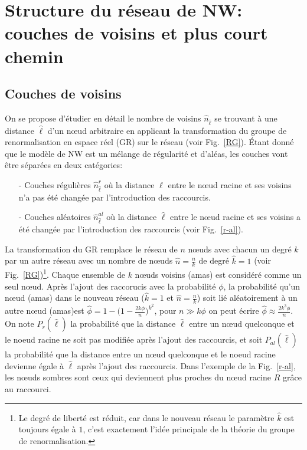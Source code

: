 \section{Structure du réseau de NW: couches de voisins et plus court chemin }

\subsection{Couches de voisins}
On se propose d'étudier en détail le nombre de voisins  $\hat{n}_{\hat{\ell}}$ se trouvant  à une distance $\hat{\ell}$ d'un nœud arbitraire en applicant la transformation du groupe de renormalisation en espace réel (GR) sur le réseau (voir Fig.~\ref{RG}). \'{E}tant donné que le modèle de NW est un mélange de régularité et d'aléas, les couches vont être séparées en deux catégories: 
\begin{itemize}
\item[-] Couches régulières $\hat{n}_{\hat{\ell}}^r$ où la distance $\hat{\ell}$ entre le nœud racine et ses voisins n'a pas été changée par l'introduction des raccourcis.
\item [-] Couches aléatoires $\hat{n}_{\hat{\ell}}^{al}$ où la distance $\hat{\ell}$ entre le nœud racine et ses voisins a été changée par l'introduction des raccourcis (voir Fig.~\ref{r-al}).
\end{itemize}
La transformation du GR remplace le réseau de $n$ nœuds avec chacun un degré $k$ par un autre réseau avec un nombre de nœuds {$\hat{n}$}$=\frac{n}{k}$ de degré $\hat{k}=1$
(voir Fig.~\ref{RG})\footnote{Le degré de liberté est réduit, car dans le nouveau réseau le paramètre  $\hat{k}$  est toujours égale à $1$, c'est exactement l'idée principale de la théorie du groupe de renormalisation.}. Chaque ensemble de $k$ nœuds voisins (\textsf{amas}) est considéré comme un seul nœud. Après l'ajout des raccorucis avec la probabilité $\phi$, la probabilité qu'un nœud (\textsf{amas}) dans le nouveau réseau ($\hat{k}=1$ et $\hat{n}=\frac{n}{k}$) soit lié aléatoirement à un autre nœud (\textsf{amas})est $\hat{\phi}=1-\big(1-\frac{2k\phi}{n}\big)^{k^2}$, pour $n\gg k\phi$ on peut écrire $\hat{\phi}\approx \frac{2k^3\phi}{n}$. On note $P_r(\hat{\ell})$ la probabilité que la distance $\hat{\ell}$ entre un nœud quelconque et le noeud racine ne soit pas modifiée après l'ajout des raccourcis, et soit $P_{al}(\hat{\ell})$ la probabilité que la distance entre un nœud quelconque et le noeud racine devienne égale à $\hat{\ell}$ après l'ajout des raccourcis. Dans l'exemple de la Fig.~\ref{r-al}, les nœuds sombres sont ceux qui deviennent plus proches du nœud racine $R$ grâce au raccourci.\\ 
